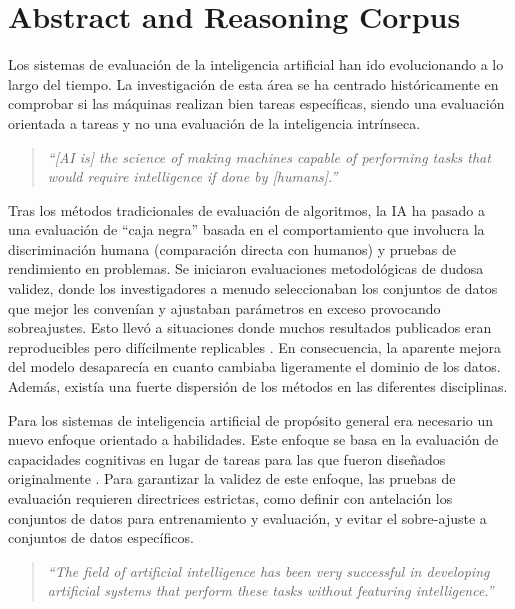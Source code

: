 \documentclass[11pt,a4paper,spanish]{book}
\numberwithin{equation}{chapter}
\numberwithin{figure}{chapter}
\begin{document}
\section{Abstract and Reasoning Corpus}\label{sec:arc}

Los sistemas de evaluación de la inteligencia artificial han ido evolucionando a lo largo del tiempo. La investigación de esta área se ha centrado
históricamente en comprobar si las máquinas realizan bien tareas específicas, siendo una evaluación orientada a tareas y no una evaluación de 
la inteligencia intrínseca.

\begin{quote}
\itshape
``[AI is] the science of making machines capable of performing tasks that would require intelligence if done by [humans].''
\end{quote}

\begin{center}
\cite{minsky1968matter}
\end{center}

Tras los métodos tradicionales de evaluación de algoritmos, la IA ha pasado a una evaluación de ``caja negra'' basada en el comportamiento que involucra la discriminación
humana (comparación directa con humanos) y pruebas de rendimiento en problemas. Se iniciaron evaluaciones metodológicas de dudosa validez,
donde los investigadores a menudo seleccionaban los conjuntos de datos que mejor les convenían y ajustaban parámetros en exceso provocando sobreajustes. Esto
llevó a situaciones donde muchos resultados publicados eran reproducibles pero difícilmente replicables \cite{hernandez2017evaluation}. En consecuencia,
la aparente mejora del modelo desaparecía en cuanto cambiaba ligeramente el dominio de los datos. Además, existía una fuerte dispersión de los métodos
en las diferentes disciplinas.

Para los sistemas de inteligencia artificial de propósito general era necesario un nuevo enfoque orientado a habilidades. Este enfoque se basa en la evaluación de capacidades cognitivas en lugar de tareas para
las que fueron diseñados originalmente \cite{hernandez2017evaluation}. Para garantizar la validez de este enfoque, las pruebas de evaluación requieren directrices estrictas, como definir con antelación
los conjuntos de datos para entrenamiento y evaluación, y evitar el sobre-ajuste a conjuntos de datos específicos.

\begin{quote}
\itshape
``The field of artificial intelligence has been very successful in developing artificial systems that perform these tasks without featuring intelligence.''
\end{quote}
\end{document}
